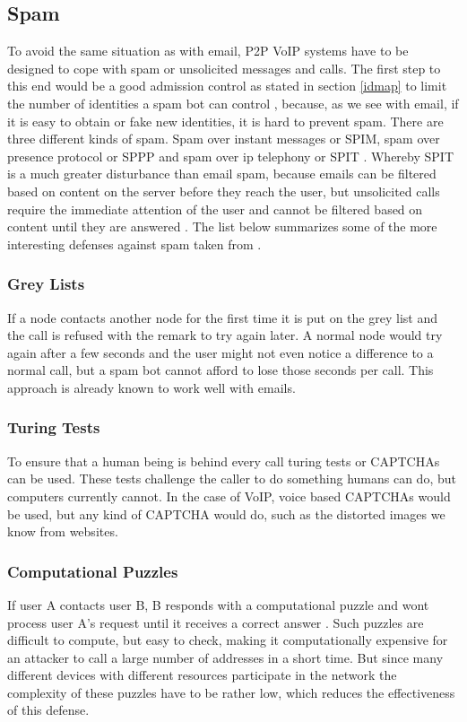 \documentclass[a4paper,10pt]{article}
\begin{document}
\subsection{Spam}
\label{spam}
To avoid the same situation as with email, P2P VoIP systems have to be designed
to cope with spam or unsolicited messages and calls. The first step to this end
would be a good admission control as stated in section \ref{idmap} to limit the
number of identities a spam bot can control \cite{touceda}, because, as we see
with email,
if it is easy to obtain or fake new identities, it is hard to prevent spam.
There are three different kinds of spam. Spam over instant messages or SPIM,
spam over
presence protocol or SPPP and spam over ip telephony or SPIT \cite{touceda}.
Whereby SPIT is a much greater disturbance than email spam, because emails can
be filtered based on content on the server before they reach the user, but
unsolicited calls require the immediate attention of the user and cannot be
filtered
based on content until they are answered \cite{heikkilae}. The list below
summarizes some of the more interesting defenses against spam taken from
\cite{touceda}.

\subsubsection{Grey Lists}
If a node contacts another node for the first time it is put on the grey list
and the call is refused with the remark to try again later.
A normal node would try again after a few seconds and the user might not even
notice a difference to a normal call, but a spam bot cannot afford to lose those
seconds per call.
This approach is already known to work well with emails.

\subsubsection{Turing Tests}
To ensure that a human being is behind every call turing tests or CAPTCHAs can
be used. These tests challenge the caller to do something
humans can do, but computers currently cannot. In the case of VoIP, voice based
CAPTCHAs would be used, but any kind
of CAPTCHA would do, such as the distorted images we know from websites.

\subsubsection{Computational Puzzles}
If user A contacts user B, B responds with a computational puzzle and wont
process user A's request until it receives a correct answer \cite{touceda}. Such
puzzles
are difficult to compute, but easy to check, making it computationally expensive
for an attacker to call a large number of addresses in a short time.
But since many different devices with different resources participate in the
network the complexity of these puzzles have to be rather low, which
reduces the effectiveness of this defense.
\end{document}
